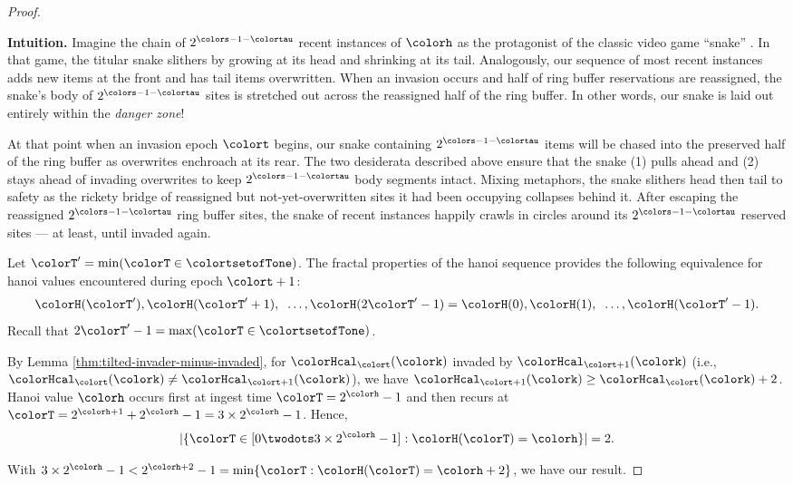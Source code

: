 \begin{proof}
\begin{mybox}
\textbf{Intuition.}
Imagine the chain of $2^{\colors - 1 - \colortau}$ recent instances of \hv{} $\colorh$ as the protagonist of the classic video game ``snake'' \citep{de2016complexity}.
In that game, the titular snake slithers by growing at its head and shrinking at its tail.
Analogously, our sequence of most recent \hv{} instances adds new items at the front and has tail items overwritten.
When an invasion occurs and half of ring buffer reservations are reassigned, the snake's body of $2^{\colors - 1 - \colortau}$ sites is stretched out across the reassigned half of the ring buffer.
In other words, our snake is laid out entirely within the \textit{danger zone}!

At that point when an invasion epoch $\colort$ begins, our snake containing $2^{\colors - 1 - \colortau}$ items will be chased into the preserved half of the ring buffer as overwrites enchroach at its rear.
The two desiderata described above ensure that the snake (1) pulls ahead and (2) stays ahead of invading overwrites to keep $2^{\colors - 1 - \colortau}$ body segments intact.
Mixing metaphors, the snake slithers head then tail to safety as the rickety bridge of reassigned but not-yet-overwritten sites it had been occupying collapses behind it.
After escaping the reassigned $2^{\colors - 1 - \colortau}$ ring buffer sites, the snake of recent \hv{} instances happily crawls in circles around its $2^{\colors - 1 - \colortau}$ reserved sites --- at least, until invaded again.
\end{mybox}

\begin{proofpart}
Let $\colorT' = \min(\colorT \in \colortsetofTone)$.
The fractal properties of the hanoi sequence provides the following equivalence for hanoi values encountered during epoch $\colort + 1$:
\begin{align*}
\colorH(\colorT'), \colorH(\colorT'+1), \;\;\ldots, \colorH(2\colorT' - 1) = \colorH(0), \colorH(1), \;\;\ldots, \colorH(\colorT' - 1).
\end{align*}
Recall that $2\colorT' - 1 = \max(\colorT \in \colortsetofTone)$.

By Lemma \ref{thm:tilted-invader-minus-invaded}, for \hv{} $\colorHcal_{\colort}(\colork)$ invaded by \hv{} $\colorHcal_{\colort + 1}(\colork)$ (i.e., $\colorHcal_{\colort}(\colork) \neq \colorHcal_{\colort + 1}(\colork)$), we have $\colorHcal_{\colort + 1}(\colork) \geq \colorHcal_{\colort}(\colork) + 2$.
Hanoi value $\colorh$ occurs first at ingest time $\colorT = 2^{\colorh} - 1$ and then recurs at $\colorT = 2^{\colorh + 1} + 2^{\colorh} - 1 = 3 \times 2^{\colorh} - 1$.
Hence,
\begin{align*}
|\{\colorT \in [0 \twodots 3 \times 2^{\colorh} - 1] : \colorH(\colorT) = \colorh\}| = 2.
\end{align*}
\end{proofpart}
With $3 \times 2^{\colorh} - 1 < 2^{\colorh + 2} - 1 = \min\{\colorT : \colorH(\colorT) = \colorh + 2\}$, we have our result.


\end{proof}
